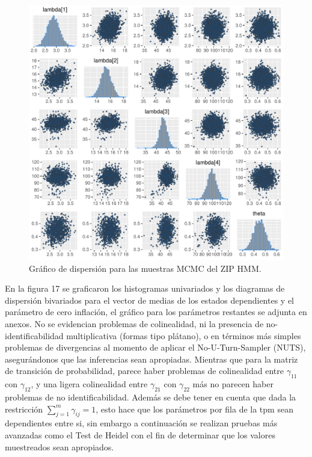 \documentclass[a4paper]{article}\usepackage[]{graphicx}\usepackage[]{color}
\makeatletter
\def\maxwidth{ %
  \ifdim\Gin@nat@width>\linewidth
    \linewidth
  \else
    \Gin@nat@width
  \fi
}
\newenvironment{knitrout}{}{} %
\makeatother
\begin{document}
\begin{knitrout}
\color{fgcolor}\begin{figure}
\includegraphics[width=\maxwidth]{figure/unnamed-chunk-52-1} \caption[Gráfico de dispersión para las muestras MCMC del ZIP HMM]{Gráfico de dispersión para las muestras MCMC del ZIP HMM.}\label{fig:unnamed-chunk-52}
\end{figure}


\end{knitrout}

En la figura 17 se graficaron los histogramas univariados y los diagramas de dispersión bivariados para el vector de medias de los estados dependientes y el parámetro de cero inflación, el gráfico para los parámetros restantes se adjunta en anexos. No se evidencian problemas de colinealidad, ni la presencia de no-identificabilidad multiplicativa (formas tipo plátano), o en términos más simples problemas de divergencias al momento de aplicar el No-U-Turn-Sampler (NUTS), asegurándonos que las inferencias sean apropiadas. Mientras que para la matriz de transición de probabilidad, parece haber problemas de colinealidad entre $\gamma_{11}$ con $\gamma_{12}$, y una ligera colinealidad entre $\gamma_{21}$ con $\gamma_{22}$ más no parecen haber problemas de no identificabilidad. Además se debe tener en cuenta que dada la restricción $\sum_{j=1}^m \gamma_{ij} = 1$, esto hace que los parámetros por fila de la tpm sean dependientes entre si, sin embargo a continuación se realizan pruebas más avanzadas como el Test de Heidel con el fin de determinar que los valores muestreados sean apropiados.
\end{document}

